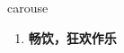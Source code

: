 
\begin{frame}
{\huge carouse}
\begin{center}
\begin{enumerate}\Large
  \item \textbf{畅饮，狂欢作乐}
\end{enumerate}
\end{center}
\end{frame}
